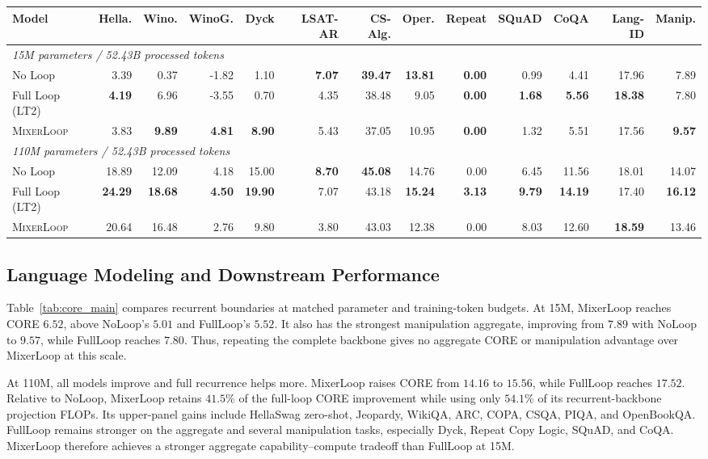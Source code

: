 \documentclass[letterpaper]{article} %
\newcommand{\method}{\textsc{MixerLoop}}
\begin{document}
\begin{table}[t]
\begin{tabular}{lrrrrrrrrrrrr}
\toprule
Model
& Hella. & Wino. & WinoG. & Dyck & LSAT-AR
& CS-Alg. & Oper. & Repeat & SQuAD & CoQA & Lang-ID & Manip. \\
\midrule
\multicolumn{13}{l}{\textit{15M parameters / 52.43B processed tokens}} \\
No Loop
& 3.39 & 0.37 & -1.82 & 1.10 & \textbf{7.07}
& \textbf{39.47} & \textbf{13.81} & \textbf{0.00} & 0.99 & 4.41 & 17.96 & 7.89 \\
Full Loop (LT2)
& \textbf{4.19} & 6.96 & -3.55 & 0.70 & 4.35
& 38.48 & 9.05 & \textbf{0.00} & \textbf{1.68} & \textbf{5.56} & \textbf{18.38} & 7.80 \\
\method{}
& 3.83 & \textbf{9.89} & \textbf{4.81} & \textbf{8.90} & 5.43
& 37.05 & 10.95 & \textbf{0.00} & 1.32 & 5.51 & 17.56 & \textbf{9.57} \\
\midrule
\multicolumn{13}{l}{\textit{110M parameters / 52.43B processed tokens}} \\
No Loop
& 18.89 & 12.09 & 4.18 & 15.00 & \textbf{8.70}
& \textbf{45.08} & 14.76 & 0.00 & 6.45 & 11.56 & 18.01 & 14.07 \\
Full Loop (LT2)
& \textbf{24.29} & \textbf{18.68} & \textbf{4.50} & \textbf{19.90} & 7.07
& 43.18 & \textbf{15.24} & \textbf{3.13} & \textbf{9.79} & \textbf{14.19} & 17.40 & \textbf{16.12} \\
\method{}
& 20.64 & 16.48 & 2.76 & 9.80 & 3.80
& 43.03 & 12.38 & 0.00 & 8.03 & 12.60 & \textbf{18.59} & 13.46 \\
\bottomrule
\end{tabular}
\end{table}

\subsection{Language Modeling and Downstream Performance}

Table~\ref{tab:core_main} compares recurrent boundaries at matched parameter
and training-token budgets. At 15M, MixerLoop reaches CORE $6.52$, above
NoLoop's $5.01$ and FullLoop's $5.52$. It also has the strongest manipulation
aggregate, improving from $7.89$ with NoLoop to $9.57$, while FullLoop reaches
$7.80$. Thus, repeating the complete backbone gives no aggregate CORE or
manipulation advantage over MixerLoop at this scale.

At 110M, all models improve and full recurrence helps more. MixerLoop raises
CORE from $14.16$ to $15.56$, while FullLoop reaches $17.52$. Relative to
NoLoop, MixerLoop retains $41.5\%$ of the full-loop CORE improvement while
using only $54.1\%$ of its recurrent-backbone projection FLOPs. Its upper-panel
gains include HellaSwag zero-shot, Jeopardy, WikiQA, ARC, COPA, CSQA, PIQA, and
OpenBookQA. FullLoop remains stronger on the aggregate and several
manipulation tasks, especially Dyck, Repeat Copy Logic, SQuAD, and CoQA.
MixerLoop therefore achieves a stronger aggregate capability--compute tradeoff
than FullLoop at 15M.
\end{document}
